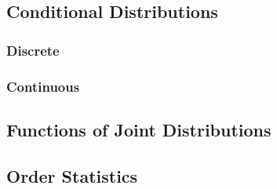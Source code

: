 \documentclass[a4paper,10pt]{article}
\begin{document}
\subsection{Conditional Distributions}
\subsubsection{Discrete}
\subsubsection{Continuous}

\subsection{Functions of Joint Distributions}

\subsection{Order Statistics}
\end{document}

